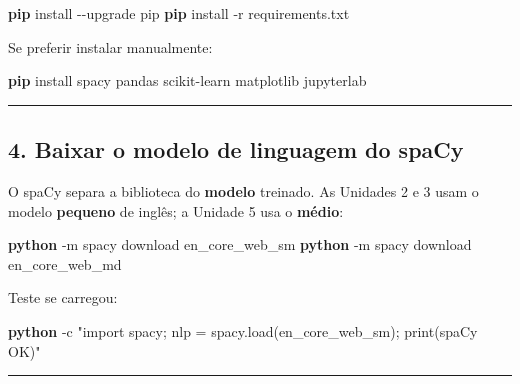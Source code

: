 \documentclass[
  brazilian,
  11pt,
]{article}
\newenvironment{Shaded}{\begin{snugshade}}{\end{snugshade}}
\newcommand{\AttributeTok}[1]{\textcolor[rgb]{0.16,0.50,0.73}{#1}}
\newcommand{\ExtensionTok}[1]{\textcolor[rgb]{0.00,0.60,1.00}{\textbf{#1}}}
\newcommand{\NormalTok}[1]{\textcolor[rgb]{0.81,0.81,0.76}{#1}}
\newcommand{\StringTok}[1]{\textcolor[rgb]{0.96,0.31,0.31}{#1}}
\begin{document}
\begin{Shaded}
\begin{Highlighting}[]
\ExtensionTok{pip}\NormalTok{ install }\AttributeTok{{-}{-}upgrade}\NormalTok{ pip}
\ExtensionTok{pip}\NormalTok{ install }\AttributeTok{{-}r}\NormalTok{ requirements.txt}
\end{Highlighting}
\end{Shaded}

Se preferir instalar manualmente:

\begin{Shaded}
\begin{Highlighting}[]
\ExtensionTok{pip}\NormalTok{ install spacy pandas scikit{-}learn matplotlib jupyterlab}
\end{Highlighting}
\end{Shaded}

\begin{center}\rule{0.5\linewidth}{0.5pt}\end{center}

\subsection{4. Baixar o modelo de linguagem do
spaCy}\label{baixar-o-modelo-de-linguagem-do-spacy}

O spaCy separa a biblioteca do \textbf{modelo} treinado. As Unidades 2 e
3 usam o modelo \textbf{pequeno} de inglês; a Unidade 5 usa o
\textbf{médio}:

\begin{Shaded}
\begin{Highlighting}[]
\ExtensionTok{python} \AttributeTok{{-}m}\NormalTok{ spacy download en\_core\_web\_sm}
\ExtensionTok{python} \AttributeTok{{-}m}\NormalTok{ spacy download en\_core\_web\_md}
\end{Highlighting}
\end{Shaded}

Teste se carregou:

\begin{Shaded}
\begin{Highlighting}[]
\ExtensionTok{python} \AttributeTok{{-}c} \StringTok{"import spacy; nlp = spacy.load(\textquotesingle{}en\_core\_web\_sm\textquotesingle{}); print(\textquotesingle{}spaCy OK\textquotesingle{})"}
\end{Highlighting}
\end{Shaded}

\begin{center}\rule{0.5\linewidth}{0.5pt}\end{center}
\end{document}
